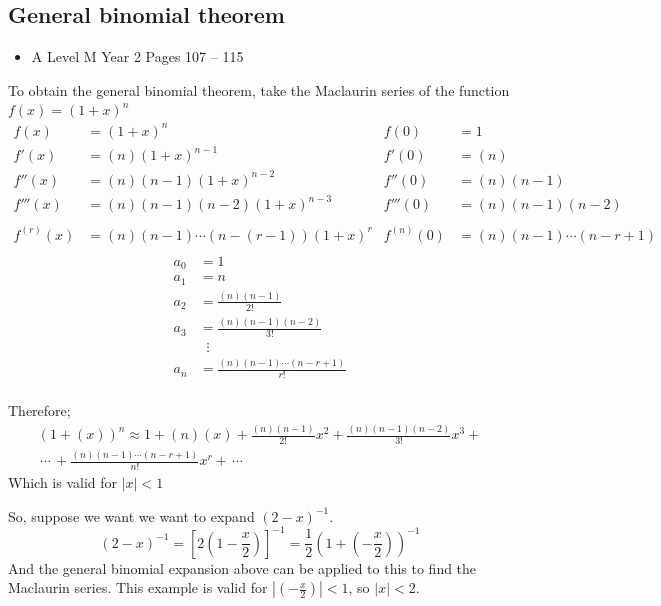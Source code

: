 \documentclass[11pt, a4paper]{article}
\begin{document}
\subsection{General binomial theorem}
\label{generalbinomialtheorem}
\begin{itemize}
\item A Level M Year 2 \hspace{1cm} \phantom{ AS / } Pages 107 -- 115
\end{itemize} \par
To obtain the general binomial theorem, take the Maclaurin series of the function $f(x)=(1+x)^{n}$
\small
\begin{align*}
f(x)&=(1+x)^{n} & f(0)&=1  \\
f'(x)&=(n)(1+x)^{n-1} & f'(0)&=(n)  \\
f''(x)&=(n)(n-1)(1+x)^{n-2} & f''(0)&=(n)(n-1)  \\
f'''(x)&=(n)(n-1)(n-2)(1+x)^{n-3} & f'''(0)&=(n)(n-1)(n-2)  \\
&&& \\
f^{(r)}(x)&=(n)(n-1)\cdots(n-(r-1))(1+x)^{r} & f^{(n)}(0)&=(n)(n-1)\cdots (n-r+1) \\
\end{align*}
\vspace{-1.2cm}
\begin{align*}
a_{0}&=1 \\
a_{1}&=n \\
a_{2}&=\frac{(n)(n-1)}{2!} \\
a_{3}&=\frac{(n)(n-1)(n-2)}{3!} \\
&\;\;\vdots \\
a_{n}&=\frac{(n)(n-1)\cdots (n-r+1)}{r!} \\
\end{align*}
\normalsize

Therefore;
\begin{multline*}
(1+(x))^{n}\approx1+(n)(x)+\frac{(n)(n-1)}{2!}x^{2}+\frac{(n)(n-1)(n-2)}{3!}x^{3}+\\ \,\cdots\, + \frac{(n)(n-1)\cdots (n-r+1)}{n!}x^{r} +\,\cdots
\end{multline*}
Which is valid for $|x|<1$ \newline \par

So, suppose we want we want to expand $(2-x)^{-1}$.
\begin{equation*}
(2-x)^{-1}=\left[ 2\left(1-\frac{x}{2}\right) \right]^{-1}=\frac{1}{2}\left(1+\left(-\frac{x}{2}\right)\right)^{-1}
\end{equation*}
And the general binomial expansion above can be applied to this to find the Maclaurin series. This example is valid for $\left| \left(-\frac{x}{2}\right)  \right|<1$, so $|x|<2$.
\end{document}

